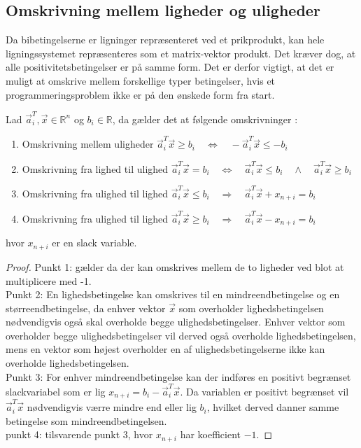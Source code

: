 \subsection{Omskrivning mellem ligheder og uligheder}
Da bibetingelserne er ligninger repræsenteret ved et prikprodukt, kan hele ligningssystemet repræsenteres som et matrix-vektor produkt. Det kræver dog, at alle positivitetsbetingelser er på samme form. 
Det er derfor vigtigt, at det er muligt at omskrive mellem forskellige typer betingelser, hvis et programmeringsproblem ikke er på den ønskede form fra start.

\begin{stn}
Lad $\vec{a}_i^T,\vec{x} \in \mathds{R}^n$ og $b_i \in \mathds{R}$, da gælder det at følgende omskrivninger :
\begin{enumerate}[label=(\alph*)]
\item Omskrivning mellem uligheder \qquad \quad $\vec{a}_i^T\vec{x} \geq b_i \quad \Leftrightarrow \quad -\vec{a}_i^T\vec{x} \leq -b_i$
\item Omskrivning fra lighed til ulighed \qquad  $\vec{a}_i^T\vec{x} = b_i \quad \Leftrightarrow  \quad  \vec{a}_i^T\vec{x} \leq b_i \quad \wedge \quad  \vec{a}_i^T\vec{x} \geq b_i$
\item Omskrivning fra ulighed til lighed \qquad $\vec{a}_i^T \vec{x}  \leq b_i \quad \Rightarrow \quad  \vec{a}_i^T \vec{x}  +  x_{n+i}  = b_i$
\item Omskrivning fra ulighed til lighed \qquad $\vec{a}_i^T \vec{x}  \geq b_i \quad \Rightarrow \quad  \vec{a}_i^T \vec{x}  - x_{n+i}  = b_i$
\end{enumerate}
hvor $x_{n+i}$ er en slack variable.
\label{stn:omskr_ligulig} 
\end{stn}

\begin{proof}
Punkt 1: gælder da der kan omskrives mellem de to ligheder ved blot at multiplicere med -1.\\
Punkt 2: En lighedsbetingelse kan omskrives til en mindreendbetingelse og en størreendbetingelse, da enhver vektor $\vec{x}$ som overholder lighedsbetingelsen nødvendigvis også skal overholde begge ulighedsbetingelser. Enhver vektor som overholder begge ulighedsbetingelser vil derved også overholde lighedsbetingelsen, mens en vektor som højest overholder en af ulighedsbetingelserne ikke kan overholde lighedsbetingelsen.\\
Punkt 3: For enhver mindreendbetingelse kan der indføres en positivt begrænset slackvariabel som er lig $x_{n+i}  = b_i - \vec{a}_i^T \vec{x}$. Da variablen er positivt begrænset vil $\vec{a}_i^T \vec{x}$ nødvendigvis værre mindre end eller lig $b_i$, hvilket derved danner samme betingelse som mindreendbetingelsen.\\
punkt 4: tilsvarende punkt 3, hvor $x_{n+i}$ har koefficient $-1$.
\end{proof}

